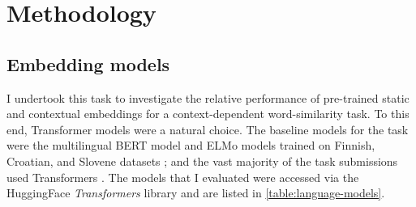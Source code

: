 \section{Methodology}
\label{sec:methodology}

\subsection{Embedding models}

I undertook this task to investigate the relative performance of pre-trained static and
contextual embeddings for a context-dependent word-similarity task.
To this end, Transformer models \parencite{Vaswani2017} were a natural choice.
The baseline models for the task were the multilingual BERT model
\parencite{Devlin2019} and ELMo models \parencite{Peters2018a} trained on Finnish,
Croatian, and Slovene datasets \parencite{Ulcar2020a}; and the vast majority of the
task submissions used Transformers \parencite[36,42-45]{Armendariz2020a}.
The models that I evaluated were accessed via the HuggingFace \emph{Transformers}
library \parencite{Wolf2020a} and are listed in \cref{table:language-models}.

